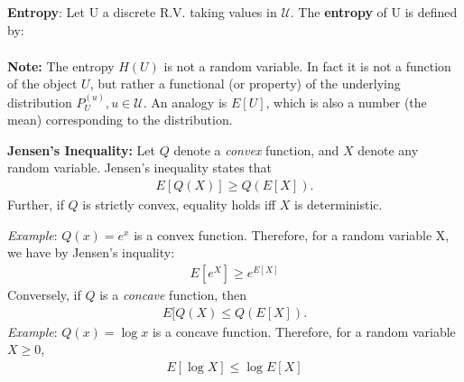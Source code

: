 \documentclass{article}
\begin{document}
\begin{definition}
\textbf{Entropy}: Let U a discrete R.V. taking values in $\mathcal{U}$.  The \textbf{entropy} of U is defined by: 
\begin{eqnarray}
\end{eqnarray}
\end{definition}

\textbf{Note:} The entropy $H(U)$ is not a random variable. In fact it is not a function of the object $U$, but rather a functional (or property) of the underlying distribution $P_U^{(u)}, u \in \mathcal{U}$. An analogy is $E[U]$, which is also a number (the mean) corresponding to the distribution. 

\textbf{Jensen's Inequality:} Let $Q$ denote a {\em convex} function, and $X$ denote any random variable. Jensen's inequality states that
\begin{align}
E[Q(X)] \geq Q(E[X]).
\end{align} 
Further, if $Q$ is strictly convex, equality holds iff $X$ is deterministic.

{\em Example}: $Q(x) = e^{x}$ is a convex function. Therefore, for a random variable X, we have by Jensen's inquality:
\begin{align*}
E[ e^X ] \geq e^{E[X]}
\end{align*}
Conversely, if $Q$ is a {\em concave} function, then
\begin{align}
E[Q(X) \leq Q(E[X]).
\end{align}
{\em Example}: $Q(x) = \log x $ is a concave function. Therefore, for a random variable $X \geq 0$, 
\begin{align}
E[ \log X ] \leq \log E[X] 
\end{align}
\end{document}
